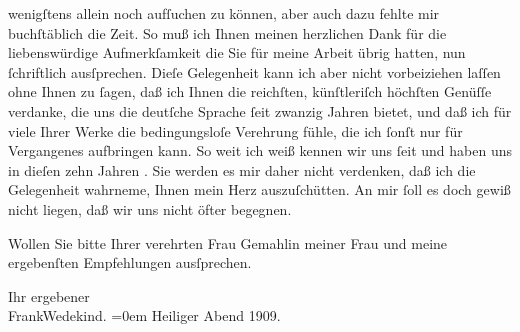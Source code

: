                wenigſtens allein noch aufſuchen zu können, aber auch dazu fehlte mir buchſtäblich
               die Zeit. So muß ich Ihnen meinen herzlichen Dank für die liebenswürdige
               Aufmerkſamkeit {\pb}die Sie für meine Arbeit
               übrig hatten, nun ſchriftlich ausſprechen. Dieſe Gelegenheit kann ich aber nicht
               vorbeiziehen laſſen ohne Ihnen zu ſagen, daß ich Ihnen die reichſten, künſtleriſch
               höchſten Genüſſe verdanke, die uns die deutſche Sprache ſeit zwanzig Jahren bietet,
               und daß ich für viele Ihrer Werke die bedingungsloſe Verehrung fühle, die ich ſonſt
               nur für Vergangenes aufbringen kann. So weit ich weiß kennen wir uns ſeit \label{K_L01909-1v}\label{K_L01909-1} und haben uns in dieſen zehn Jahren {\pb}\label{K_L01909-2v}\label{K_L01909-2}. Sie werden es mir daher nicht verdenken, daß ich die Gelegenheit wahrneme,
               Ihnen mein Herz auszuſchütten. An mir ſoll es doch gewiß nicht liegen, daß wir uns
               nicht öfter begegnen.\pend
           
\pstart
           Wollen Sie bitte Ihrer verehrten Frau Gemahlin meiner Frau und meine ergebenſten Empfehlungen ausſprechen.\pend
           
\pstart
           Ihr ergebener{\\[\baselineskip]}\spacefill\mbox{FrankWedekind.}\pend
           \leftskip=0em{}
\pstart
           Heiliger Abend 1909.\pend
           \endnumbering{}  
      